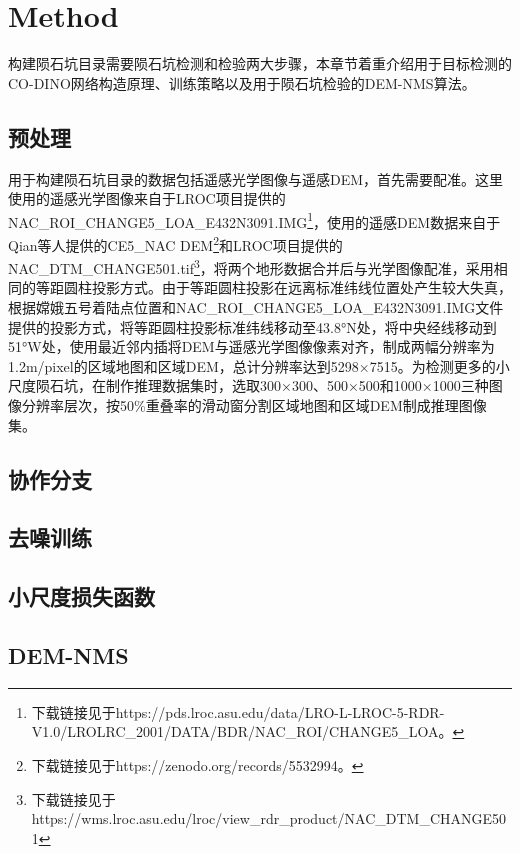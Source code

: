 \section{Method}
\label{sec:method}
构建陨石坑目录需要陨石坑检测和检验两大步骤，本章节着重介绍用于目标检测的CO-DINO网络构造原理、训练策略以及用于陨石坑检验的DEM-NMS算法。
\subsection{预处理}
用于构建陨石坑目录的数据包括遥感光学图像与遥感DEM，首先需要配准。这里使用的遥感光学图像来自于LROC项目提供的NAC\_ROI\_CHANGE5\_LOA\_E432N3091.IMG\footnote{ 下载链接见于https://pds.lroc.asu.edu/data/LRO-L-LROC-5-RDR-V1.0/LROLRC\_2001/DATA/BDR/NAC\_ROI/CHANGE5\_LOA。}，使用的遥感DEM数据来自于Qian\cite{qianCopernicanaged200Ma2021}等人提供的CE5\_NAC DEM\footnote{下载链接见于https://zenodo.org/records/5532994。}和LROC项目提供的NAC\_DTM\_CHANGE501.tif\footnote{ 下载链接见于https://wms.lroc.asu.edu/lroc/view\_rdr\_product/NAC\_DTM\_CHANGE501}，将两个地形数据合并后与光学图像配准，采用相同的等距圆柱投影方式。由于等距圆柱投影在远离标准纬线位置处产生较大失真，根据嫦娥五号着陆点位置和NAC\_ROI\_CHANGE5\_LOA\_E432N3091.IMG文件提供的投影方式，将等距圆柱投影标准纬线移动至43.8°N处，将中央经线移动到51°W处，使用最近邻内插将DEM与遥感光学图像像素对齐，制成两幅分辨率为1.2m/pixel的区域地图和区域DEM，总计分辨率达到5298×7515。为检测更多的小尺度陨石坑，在制作推理数据集时，选取300×300、500×500和1000×1000三种图像分辨率层次，按50\%重叠率的滑动窗分割区域地图和区域DEM制成推理图像集。
\subsection{协作分支}
\subsection{去噪训练}
\subsection{小尺度损失函数}
\subsection{DEM-NMS}
